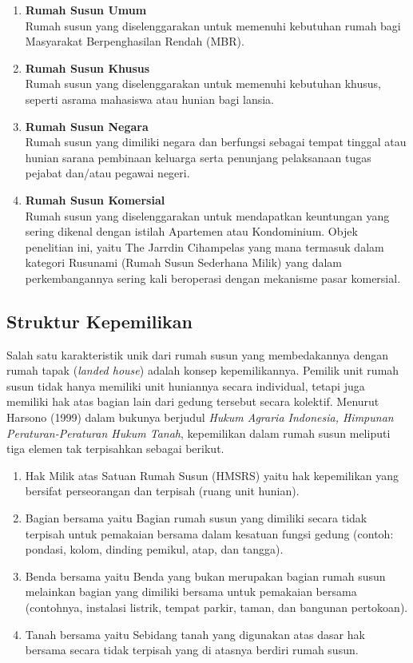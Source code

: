 \begin{enumerate}
    \item \textbf{Rumah Susun Umum} \\
    Rumah susun yang diselenggarakan untuk memenuhi kebutuhan rumah bagi Masyarakat Berpenghasilan Rendah (MBR).
    \item \textbf{Rumah Susun Khusus} \\
    Rumah susun yang diselenggarakan untuk memenuhi kebutuhan khusus, seperti asrama mahasiswa atau hunian bagi lansia.
    \item \textbf{Rumah Susun Negara} \\
    Rumah susun yang dimiliki negara dan berfungsi sebagai tempat tinggal atau hunian sarana pembinaan keluarga serta penunjang pelaksanaan tugas pejabat dan/atau pegawai negeri.
    \item \textbf{Rumah Susun Komersial} \\
    Rumah susun yang diselenggarakan untuk mendapatkan keuntungan yang sering dikenal dengan istilah {Apartemen} atau Kondominium. Objek penelitian ini, yaitu The Jarrdin Cihampelas yang mana termasuk dalam kategori Rusunami (Rumah Susun Sederhana Milik) yang dalam perkembangannya sering kali beroperasi dengan mekanisme pasar komersial.
\end{enumerate}

\subsection{Struktur Kepemilikan}
Salah satu karakteristik unik dari rumah susun yang membedakannya dengan rumah tapak (\textit{landed house}) adalah konsep kepemilikannya. Pemilik unit rumah susun tidak hanya memiliki unit huniannya secara individual, tetapi juga memiliki hak atas bagian lain dari gedung tersebut secara kolektif. Menurut Harsono (1999) dalam bukunya berjudul \textit{Hukum Agraria Indonesia, Himpunan Peraturan-Peraturan Hukum Tanah}, kepemilikan dalam rumah susun meliputi tiga elemen tak terpisahkan sebagai berikut.
\begin{enumerate}
    \item {Hak Milik atas Satuan Rumah Susun (HMSRS)} yaitu
    hak kepemilikan yang bersifat perseorangan dan terpisah (ruang unit hunian).
    \item {Bagian bersama} yaitu 
    Bagian rumah susun yang dimiliki secara tidak terpisah untuk pemakaian bersama dalam kesatuan fungsi gedung (contoh: pondasi, kolom, dinding pemikul, atap, dan tangga).
    \item {Benda bersama} yaitu 
    Benda yang bukan merupakan bagian rumah susun melainkan bagian yang dimiliki bersama untuk pemakaian bersama (contohnya, instalasi listrik, tempat parkir, taman, dan bangunan pertokoan).
    \item {Tanah bersama} yaitu
    Sebidang tanah yang digunakan atas dasar hak bersama secara tidak terpisah yang di atasnya berdiri rumah susun.
\end{enumerate}



